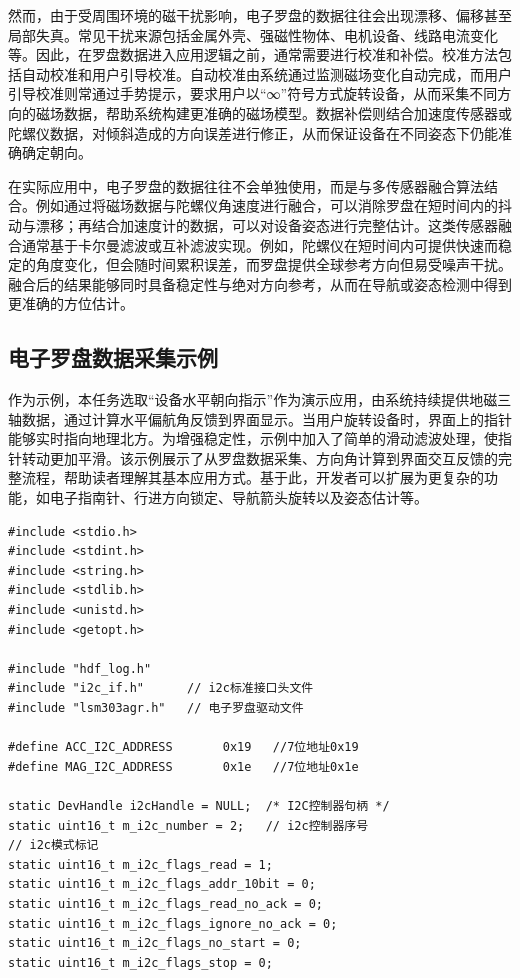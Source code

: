 然而，由于受周围环境的磁干扰影响，电子罗盘的数据往往会出现漂移、偏移甚至局部失真。常见干扰来源包括金属外壳、强磁性物体、电机设备、线路电流变化等。因此，在罗盘数据进入应用逻辑之前，通常需要进行校准和补偿。校准方法包括自动校准和用户引导校准。自动校准由系统通过监测磁场变化自动完成，而用户引导校准则常通过手势提示，要求用户以“∞”符号方式旋转设备，从而采集不同方向的磁场数据，帮助系统构建更准确的磁场模型。数据补偿则结合加速度传感器或陀螺仪数据，对倾斜造成的方向误差进行修正，从而保证设备在不同姿态下仍能准确确定朝向。

在实际应用中，电子罗盘的数据往往不会单独使用，而是与多传感器融合算法结合。例如通过将磁场数据与陀螺仪角速度进行融合，可以消除罗盘在短时间内的抖动与漂移；再结合加速度计的数据，可以对设备姿态进行完整估计。这类传感器融合通常基于卡尔曼滤波或互补滤波实现。例如，陀螺仪在短时间内可提供快速而稳定的角度变化，但会随时间累积误差，而罗盘提供全球参考方向但易受噪声干扰。融合后的结果能够同时具备稳定性与绝对方向参考，从而在导航或姿态检测中得到更准确的方位估计。
\subsection{电子罗盘数据采集示例}
作为示例，本任务选取“设备水平朝向指示”作为演示应用，由系统持续提供地磁三轴数据，通过计算水平偏航角反馈到界面显示。当用户旋转设备时，界面上的指针能够实时指向地理北方。为增强稳定性，示例中加入了简单的滑动滤波处理，使指针转动更加平滑。该示例展示了从罗盘数据采集、方向角计算到界面交互反馈的完整流程，帮助读者理解其基本应用方式。基于此，开发者可以扩展为更复杂的功能，如电子指南针、行进方向锁定、导航箭头旋转以及姿态估计等。
\begin{lstlisting}
#include <stdio.h>
#include <stdint.h>
#include <string.h>
#include <stdlib.h>
#include <unistd.h>
#include <getopt.h>

#include "hdf_log.h"
#include "i2c_if.h"      // i2c标准接口头文件
#include "lsm303agr.h"   // 电子罗盘驱动文件

#define ACC_I2C_ADDRESS       0x19   //7位地址0x19
#define MAG_I2C_ADDRESS       0x1e   //7位地址0x1e

static DevHandle i2cHandle = NULL;  /* I2C控制器句柄 */
static uint16_t m_i2c_number = 2;   // i2c控制器序号
// i2c模式标记
static uint16_t m_i2c_flags_read = 1;
static uint16_t m_i2c_flags_addr_10bit = 0;
static uint16_t m_i2c_flags_read_no_ack = 0;
static uint16_t m_i2c_flags_ignore_no_ack = 0;
static uint16_t m_i2c_flags_no_start = 0;
static uint16_t m_i2c_flags_stop = 0;
\end{lstlisting}

